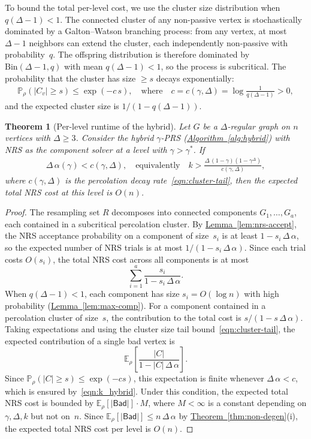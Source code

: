 \documentclass[12pt, a4paper]{article}
\theoremstyle{plain}
\newtheorem{theorem}{Theorem}
\theoremstyle{definition}
\theoremstyle{remark}
\newcommand{\mbb}{\mathbb}
\newcommand{\lt}{\left}
\newcommand{\rt}{\right}
\newcommand{\sref}[2]{\hyperref[#2]{#1~\ref*{#2}}}
\newcommand{\bad}{\mathsf{Bad}}
\begin{document}
To bound the total per-level cost, we use the cluster size distribution when \(q(\Delta-1)<1\). The connected cluster of any non-passive vertex is stochastically dominated by a Galton--Watson branching process: from any vertex, at most \(\Delta-1\) neighbors can extend the cluster, each independently non-passive with probability~\(q\). The offspring distribution is therefore dominated by \(\mathrm{Bin}(\Delta-1,q)\) with mean \(q(\Delta-1)<1\), so the process is subcritical. The probability that the cluster has size \(\geq s\) decays exponentially:
\begin{align}\label{eqn:cluster-tail}
\mbb P_\rho(|C_v|\geq s) \leq \exp(-c\,s), \quad\text{where}\quad c=c(\gamma,\Delta)=\log\frac{1}{q(\Delta-1)} > 0,
\end{align}
and the expected cluster size is \(1/(1-q(\Delta-1))\).

\begin{theorem}[Per-level runtime of the hybrid]\label{thm:hybrid-runtime}
Let \(G\) be a \(\Delta\)-regular graph on \(n\) vertices with \(\Delta\geq3\). Consider the hybrid \(\gamma\)-PRS (\sref{Algorithm}{alg:hybrid}) with NRS as the component solver at a level with \(\gamma > \gamma^*\). If
\begin{align}\label{eqn:k_hybrid}
\Delta\,\alpha(\gamma) < c(\gamma,\Delta), \quad\text{equivalently}\quad k > \frac{\Delta\,(1-\gamma)(1-\gamma^\Delta)}{c(\gamma,\Delta)},
\end{align}
where \(c(\gamma,\Delta)\) is the percolation decay rate~\eqref{eqn:cluster-tail}, then the expected total NRS cost at this level is \(O(n)\).
\end{theorem}
\begin{proof}
The resampling set \(R\) decomposes into connected components \(G_1,\ldots,G_a\), each contained in a subcritical percolation cluster. By \sref{Lemma}{lem:nrs-accept}, the NRS acceptance probability on a component of size~\(s_i\) is at least \(1-s_i\,\Delta\,\alpha\), so the expected number of NRS trials is at most \(1/(1-s_i\,\Delta\,\alpha)\). Since each trial costs \(O(s_i)\), the total NRS cost across all components is at most
\[
\sum_{i=1}^a \frac{s_i}{1-s_i\,\Delta\,\alpha}.
\]
When \(q(\Delta-1) < 1\), each component has size \(s_i = O(\log n)\) with high probability (\sref{Lemma}{lem:max-comp}). For a component contained in a percolation cluster of size~\(s\), the contribution to the total cost is \(s/(1-s\,\Delta\,\alpha)\). Taking expectations and using the cluster size tail bound~\eqref{eqn:cluster-tail}, the expected contribution of a single bad vertex is
\[
\mbb E_\rho\lt[\frac{|C|}{1-|C|\,\Delta\,\alpha}\rt].
\]
Since \(\mbb P_\rho(|C|\geq s)\leq\exp(-cs)\), this expectation is finite whenever \(\Delta\,\alpha < c\), which is ensured by~\eqref{eqn:k_hybrid}. Under this condition, the expected total NRS cost is bounded by \(\mbb E_\rho[|\bad|]\cdot M\), where \(M<\infty\) is a constant depending on \(\gamma,\Delta,k\) but not on~\(n\). Since \(\mbb E_\rho[|\bad|]\leq n\,\Delta\,\alpha\) by \sref{Theorem}{thm:non-degen}(i), the expected total NRS cost per level is \(O(n)\).
\end{proof}
\end{document}
